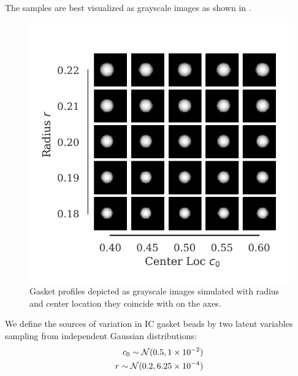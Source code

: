 \documentclass[journal, peerreview]{IEEEtran}
\begin{document}
The samples are best visualized as grayscale images as shown in .
\begin{figure}[!t]
    \centering
    \label{fig:gasketgrid}
    \includegraphics[width=0.9\linewidth]{figs/gasket.pdf}
    \caption{Gasket profiles depicted as grayscale images simulated with radius and center location they coincide with on the axes.}
\end{figure}


We define the sources of variation in IC gasket beads by two latent variables sampling from independent Gaussian distributions:
\begin{equation}
\begin{split}
	c_{0} \sim \mathcal{N}(0.5, 1\times10^{-2}) \\
	r \sim \mathcal{N}(0.2, 6.25\times10^{-4})
	\end{split}
\end{equation}
\end{document}
